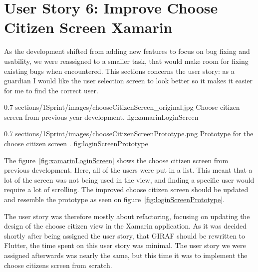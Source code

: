 \section{User Story 6: Improve Choose Citizen Screen Xamarin}
\label{sect:chooseCitizenXamarin}
As the development shifted from adding new features to focus on bug fixing and usability, we were reassigned to a smaller task, that would make room for fixing existing bugs when encountered.
This sections concerns the user story: as a guardian I would like the user selection screen to look better so it makes it easier for me to find the correct user.

        {0.7} %
        {sections/1Sprint/images/chooseCitizenScreen_original.jpg} %
        {Choose citizen screen from previous year development.} %
        {fig:xamarinLoginScreen} %
        
        {0.7} %
        {sections/1Sprint/images/chooseCitizenScreenPrototype.png} %
        {Prototype for the choose citizen screen \citep{cite:chooseCitizenPrototypeGitHub}.} %
        {fig:loginScreenPrototype} %

The figure~\ref{fig:xamarinLoginScreen} shows the choose citizen screen from previous development. Here, all of the users were put in a list. This meant that a lot of the screen was not being used in the view, and finding a specific user would require a lot of scrolling.
The improved choose citizen screen should be updated and resemble the prototype as seen on figure~\ref{fig:loginScreenPrototype}.

The user story was therefore mostly about refactoring, focusing on updating the design of the choose citizen view in the Xamarin application. As it was decided shortly after being assigned the user story, that GIRAF should be rewritten to Flutter, the time spent on this user story was minimal. The user story we were assigned afterwards was nearly the same, but this time it was to implement the choose citizens screen from scratch. 